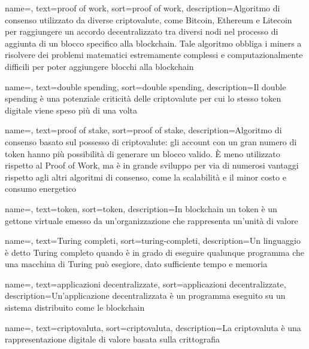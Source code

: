 {
    name=,
    text=proof of work,
    sort=proof of work,
    description={Algoritmo di consenso utilizzato da diverse criptovalute, come Bitcoin,
Ethereum e Litecoin per raggiungere un accordo decentralizzato tra diversi nodi nel
processo di aggiunta di un blocco specifico alla blockchain. Tale algoritmo obbliga i miners
a risolvere dei problemi matematici estremamente complessi e computazionalmente
difficili per poter aggiungere blocchi alla blockchain}
}

{
    name=,
    text=double spending,
    sort=double spending,
    description={Il double spending è una potenziale criticità delle criptovalute per cui lo stesso token digitale viene speso più di una volta}
}

{
    name=,
    text=proof of stake,
    sort=proof of stake,
    description={Algoritmo di consenso basato sul possesso di criptovalute: gli account con un gran numero di token hanno più possibilità di generare un blocco valido. È meno utilizzato rispetto al Proof of Work, ma è in grande sviluppo per via di numerosi vantaggi rispetto agli altri algoritmi di consenso, come la scalabilità e il minor costo e consumo energetico}
}

{
    name=,
    text=token,
    sort=token,
    description={In blockchain un token è un gettone virtuale emesso da un'organizzazione che rappresenta un'unità di valore}
}

{
    name=,
    text=Turing completi,
    sort=turing-completi,
    description={Un linguaggio è detto Turing completo quando è in grado di eseguire qualunque programma che una macchina di Turing può esegiore, dato sufficiente tempo e memoria}
}

{
    name=,
    text=applicazioni decentralizzate,
    sort=applicazioni decentralizzate,
    description={Un'applicazione decentralizzata è un programma eseguito su un sistema distribuito come le blockchain}
}

{
    name=,
    text=criptovaluta,
    sort=criptovaluta,
    description={La criptovaluta è una rappresentazione digitale di valore basata sulla crittografia}
}

